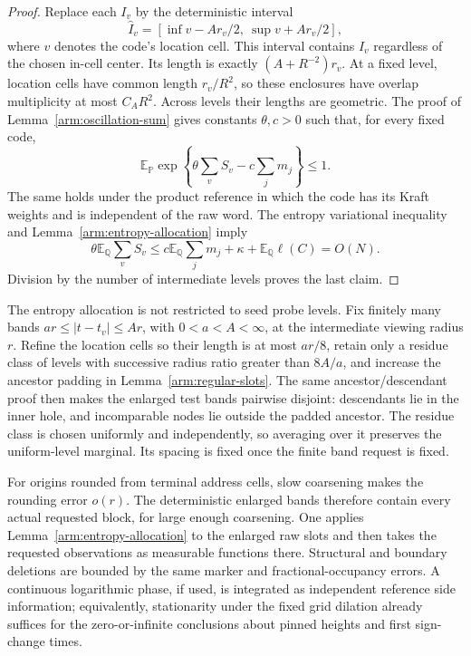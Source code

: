\begin{proof}
Replace each $I_v$ by the deterministic interval
\[
 \widehat I_v=
 [\inf v-A r_v/2,\ \sup v+A r_v/2],
\]
where $v$ denotes the code's location cell.  This interval contains
$I_v$ regardless of the chosen in-cell center.  Its length is exactly
$(A+R^{-2})r_v$.  At a fixed level, location cells have common length
$r_v/R^2$, so these enclosures have overlap multiplicity at most
$C_A R^2$.  Across levels their lengths are geometric.  The proof of
Lemma~\ref{arm:oscillation-sum} gives constants $\theta,c>0$ such
that, for every fixed code,
\[
 \mathbb E_{\mathbb P}
 \exp\left\{\theta\sum_v S_v-c\sum_jm_j\right\}\le1.
\]
The same holds under the product reference in which the code has
its Kraft weights and is independent of the raw word.  The entropy
variational inequality and Lemma~\ref{arm:entropy-allocation} imply
\[
 \theta\mathbb E_{\mathbb Q}\sum_vS_v
 \le c\mathbb E_{\mathbb Q}\sum_jm_j+
       \kappa+\mathbb E_{\mathbb Q}\ell(C)=O(N).
\]
Division by the number of intermediate levels proves the last claim.
\end{proof}

\begin{remark}
\label{arm:coarsened-bands}
The entropy allocation is not restricted to seed probe levels.  Fix
finitely many bands $a r\le |t-t_v|\le A r$, with $0<a<A<\infty$,
at the intermediate viewing radius $r$.  Refine the location cells
so their length is at most $a r/8$, retain only a residue class of
levels with successive radius ratio greater than $8A/a$, and increase
the ancestor padding in Lemma~\ref{arm:regular-slots}.  The same
ancestor/descendant proof then makes the enlarged test bands pairwise
disjoint: descendants lie in the inner hole, and incomparable nodes
lie outside the padded ancestor.  The residue class is chosen uniformly
and independently, so averaging over it preserves the uniform-level
marginal.  Its spacing is fixed once the finite band request is fixed.

For origins rounded from terminal address cells, slow coarsening makes
the rounding error $o(r)$.  The deterministic enlarged bands therefore
contain every actual requested block, for large enough coarsening.
One applies Lemma~\ref{arm:entropy-allocation} to the enlarged raw
slots and then takes the requested observations as measurable
functions there.  Structural and boundary deletions are bounded by
the same marker and fractional-occupancy errors.  A continuous
logarithmic phase, if used, is integrated as independent reference
side information; equivalently, stationarity under the fixed grid
dilation already suffices for the zero-or-infinite conclusions about
pinned heights and first sign-change times.
\end{remark}
